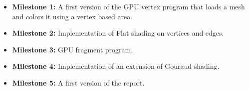 \documentclass[11pt]{article}
\begin{document}
\begin{landscape}
\begin{itemize}
  \item [] \textbf{Milestone 1:} A first version of the GPU vertex program that loads a mesh and colors it using a vertex based area.
  \item [] \textbf{Milestone 2:} Implementation of Flat shading on vertices and edges.
  \item [] \textbf{Milestone 3:} GPU fragment program.
  \item [] \textbf{Milestone 4:} Implementation of an extension of Gouraud shading.
  \item [] \textbf{Milestone 5:} A first version of the report.
\end{itemize}

\end{landscape}
\end{document}
